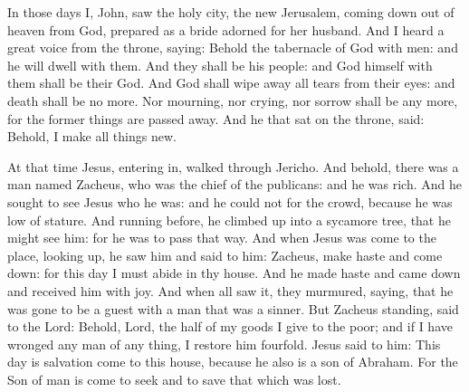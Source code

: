 


In those days
I, John, saw the holy city, the new Jerusalem, coming down out
of heaven from God, prepared as a bride adorned for her husband.
And I heard a great voice from the throne, saying: Behold the
tabernacle of God with men: and he will dwell with them.  And they shall
be his people: and God himself with them shall be their God.
And God shall wipe away all tears from their eyes: and death shall
be no more. Nor mourning, nor crying, nor sorrow shall be any more, for
the former things are passed away.
And he that sat on the throne, said: Behold, I make all things
new. %

\medskip


At that time Jesus,
entering in, walked through Jericho.
And behold, there was a man named Zacheus, who was the chief of
the publicans: and he was rich.
And he sought to see Jesus who he was: and he could not for the
crowd, because he was low of stature.
And running before, he climbed up into a sycamore tree, that he
might see him: for he was to pass that way.
And when Jesus was come to the place, looking up, he saw him and
said to him: Zacheus, make haste and come down: for this day I must
abide in thy house.
And he made haste and came down and received him with joy.
And when all saw it, they murmured, saying, that he was gone to be
a guest with a man that was a sinner.
But Zacheus standing, said to the Lord: Behold, Lord, the half of
my goods I give to the poor; and if I have wronged any man of any thing,
I restore him fourfold.
Jesus said to him: This day is salvation come to this house,
because he also is a son of Abraham.
For the Son of man is come to seek and to save that which was
lost.




\bigskip




